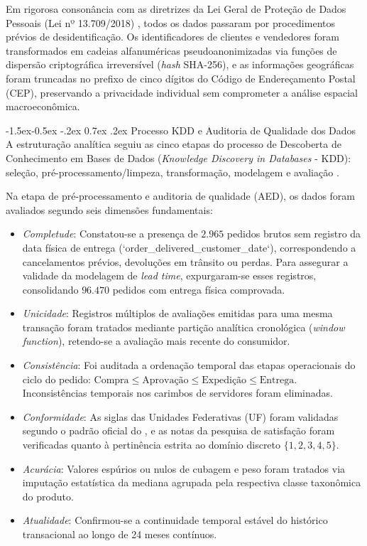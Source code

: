 \documentclass[10pt,a4paper,twocolumn]{article}
\makeatletter
\renewcommand\subsection{\@startsection{subsection}{2}{\z@}%
                                     {-1.5ex\@plus -0.5ex \@minus -.2ex}%
                                     {0.7ex \@plus .2ex}%
                                     {\normalfont\normalsize\bfseries}}
\makeatother
\begin{document}
Em rigorosa consonância com as diretrizes da Lei Geral de Proteção de Dados Pessoais (Lei nº 13.709/2018) \citep{brasil2018lgpd}, todos os dados passaram por procedimentos prévios de desidentificação. Os identificadores de clientes e vendedores foram transformados em cadeias alfanuméricas pseudoanonimizadas via funções de dispersão criptográfica irreversível (\textit{hash} SHA-256), e as informações geográficas foram truncadas no prefixo de cinco dígitos do Código de Endereçamento Postal (CEP), preservando a privacidade individual sem comprometer a análise espacial macroeconômica.

\subsection{Processo KDD e Auditoria de Qualidade dos Dados}
A estruturação analítica seguiu as cinco etapas do processo de Descoberta de Conhecimento em Bases de Dados (\textit{Knowledge Discovery in Databases} - KDD): seleção, pré-processamento/limpeza, transformação, modelagem e avaliação \citep{fayyad1996data}.

Na etapa de pré-processamento e auditoria de qualidade (AED), os dados foram avaliados segundo seis dimensões fundamentais:
\begin{itemize}
    \item \textit{Completude}: Constatou-se a presença de $2.965$ pedidos brutos sem registro da data física de entrega (`order\_delivered\_customer\_date`), correspondendo a cancelamentos prévios, devoluções em trânsito ou perdas. Para assegurar a validade da modelagem de \textit{lead time}, expurgaram-se esses registros, consolidando $96.470$ pedidos com entrega física comprovada.
    \item \textit{Unicidade}: Registros múltiplos de avaliações emitidas para uma mesma transação foram tratados mediante partição analítica cronológica (\textit{window function}), retendo-se a avaliação mais recente do consumidor.
    \item \textit{Consistência}: Foi auditada a ordenação temporal das etapas operacionais do ciclo do pedido: $\text{Compra} \le \text{Aprovação} \le \text{Expedição} \le \text{Entrega}$. Inconsistências temporais nos carimbos de servidores foram eliminadas.
    \item \textit{Conformidade}: As siglas das Unidades Federativas (UF) foram validadas segundo o padrão oficial do \citet{ibge2022divisao}, e as notas da pesquisa de satisfação foram verificadas quanto à pertinência estrita ao domínio discreto $\{1, 2, 3, 4, 5\}$.
    \item \textit{Acurácia}: Valores espúrios ou nulos de cubagem e peso foram tratados via imputação estatística da mediana agrupada pela respectiva classe taxonômica do produto.
    \item \textit{Atualidade}: Confirmou-se a continuidade temporal estável do histórico transacional ao longo de 24 meses contínuos.
\end{itemize}
\end{document}
